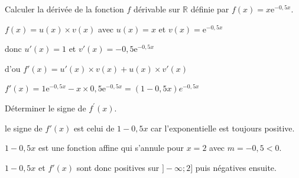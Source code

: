 \documentclass[11pt,a4paper]{article}  %
\begin{document}
\begin{enumMet}
	\item Calculer la dérivée de la fonction $f$ dérivable sur $\mathbb{R}$ définie par $f(x)=x \mathrm{e}^{-0,5 x}$.
	\begin{corrBox}
		$f(x)=u(x)\times v(x)$ avec $u(x)=x$ et $v(x)=\mathrm{e}^{-0,5 x}$
		
		donc $u'(x)=1$ et $v'(x)=-0,5\mathrm{e}^{-0,5 x}$
		
		d'ou $f'(x)=u'(x)\times v(x)+u(x)\times v'(x)$
		
		$f'(x)=1\mathrm{e}^{-0,5 x}-x\times 0,5\mathrm{e}^{-0,5 x}=(1-0,5x)e^{-0,5 x}$		
	\end{corrBox}
	\item Déterminer le signe de $f^{\prime}(x)$.
	\begin{corrBox}
		le signe de $f'(x)$ est celui de $1-0,5x$ car l'exponentielle est toujours positive.
		
		$1-0,5x$ est une fonction affine qui s'annule pour $x=2$ avec $m=-0,5<0$.
		
		$1-0,5x$ et $f'(x)$ sont donc positives sur $]-\infty;2]$ puis négatives ensuite.		
	\end{corrBox}
\end{enumMet}

\newpage

\end{document}
